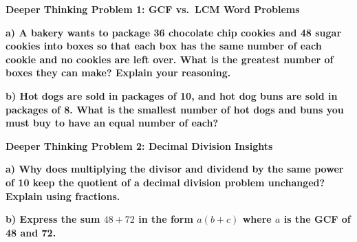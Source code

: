 \documentclass[12pt, letterpaper, fleqn]{article}
\begin{document}
\begin{tcolorbox}[colback=black!5, colframe=black!50, boxrule=1pt, arc=4mm, left=6mm, right=6mm, top=5mm, bottom=5mm]
\textbf{Deeper Thinking Problem 1: GCF vs.\ LCM Word Problems}

\medskip

\noindent
\textbf{a) A bakery wants to package 36 chocolate chip cookies and 48 sugar cookies into boxes so that each box has the same number of each cookie and no cookies are left over. What is the greatest number of boxes they can make? Explain your reasoning.}

\vspace{2cm}

\noindent
\textbf{b) Hot dogs are sold in packages of 10, and hot dog buns are sold in packages of 8. What is the smallest number of hot dogs and buns you must buy to have an equal number of each?}

\vspace{2cm}
\end{tcolorbox}
\newpage

\begin{tcolorbox}[colback=black!5, colframe=black!50, boxrule=1pt, arc=4mm, left=6mm, right=6mm, top=5mm, bottom=5mm]
\textbf{Deeper Thinking Problem 2: Decimal Division Insights}

\medskip

\noindent
\textbf{a) Why does multiplying the divisor and dividend by the same power of 10 keep the quotient of a decimal division problem unchanged? Explain using fractions.}

\vspace{2cm}

\noindent
\textbf{b) Express the sum $48 + 72$ in the form $a(b+c)$ where $a$ is the GCF of 48 and 72.}

\vspace{2cm}
\end{tcolorbox}
\newpage
\end{document}
